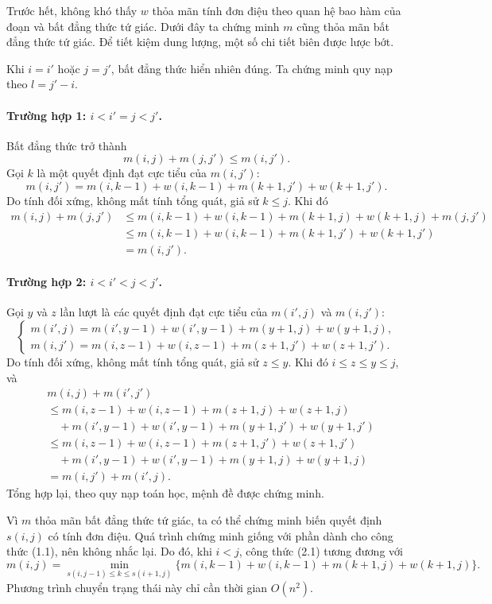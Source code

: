 \documentclass[11pt]{article}
\begin{document}
Trước hết, không khó thấy $w$ thỏa mãn tính đơn điệu theo quan hệ bao hàm của
đoạn và bất đẳng thức tứ giác. Dưới đây ta chứng minh $m$ cũng thỏa mãn bất
đẳng thức tứ giác. Để tiết kiệm dung lượng, một số chi tiết biên được lược
bớt.

Khi $i=i'$ hoặc $j=j'$, bất đẳng thức hiển nhiên đúng. Ta chứng minh quy nạp
theo $l=j'-i$.

\paragraph{Trường hợp 1: $i<i'=j<j'$.}
Bất đẳng thức trở thành
\[
  m(i,j)+m(j,j')\le m(i,j').
\]
Gọi $k$ là một quyết định đạt cực tiểu của $m(i,j')$:
\[
  m(i,j')=
  m(i,k-1)+w(i,k-1)+m(k+1,j')+w(k+1,j').
\]
Do tính đối xứng, không mất tính tổng quát, giả sử $k\le j$. Khi đó
\[
\begin{aligned}
  m(i,j)+m(j,j')
  &\le m(i,k-1)+w(i,k-1)+m(k+1,j)+w(k+1,j)+m(j,j')\\
  &\le m(i,k-1)+w(i,k-1)+m(k+1,j')+w(k+1,j')\\
  &=m(i,j').
\end{aligned}
\]

\paragraph{Trường hợp 2: $i<i'<j<j'$.}
Gọi $y$ và $z$ lần lượt là các quyết định đạt cực tiểu của $m(i',j)$ và
$m(i,j')$:
\[
\begin{cases}
  m(i',j)=
  m(i',y-1)+w(i',y-1)+m(y+1,j)+w(y+1,j),\\
  m(i,j')=
  m(i,z-1)+w(i,z-1)+m(z+1,j')+w(z+1,j').
\end{cases}
\]
Do tính đối xứng, không mất tính tổng quát, giả sử $z\le y$. Khi đó
$i\le z\le y\le j$, và
\[
\begin{aligned}
  &m(i,j)+m(i',j')\\
  &\le m(i,z-1)+w(i,z-1)+m(z+1,j)+w(z+1,j)\\
  &\quad +m(i',y-1)+w(i',y-1)+m(y+1,j')+w(y+1,j')\\
  &\le m(i,z-1)+w(i,z-1)+m(z+1,j')+w(z+1,j')\\
  &\quad +m(i',y-1)+w(i',y-1)+m(y+1,j)+w(y+1,j)\\
  &=m(i,j')+m(i',j).
\end{aligned}
\]
Tổng hợp lại, theo quy nạp toán học, mệnh đề được chứng minh.

Vì $m$ thỏa mãn bất đẳng thức tứ giác, ta có thể chứng minh biến quyết định
$s(i,j)$ có tính đơn điệu. Quá trình chứng minh giống với phần dành cho công
thức (1.1), nên không nhắc lại. Do đó, khi $i<j$, công thức (2.1) tương đương
với
\[
  m(i,j)=
  \min_{s(i,j-1)\le k\le s(i+1,j)}
  \{m(i,k-1)+w(i,k-1)+m(k+1,j)+w(k+1,j)\}.
\]
Phương trình chuyển trạng thái này chỉ cần thời gian $O(n^2)$.
\end{document}
